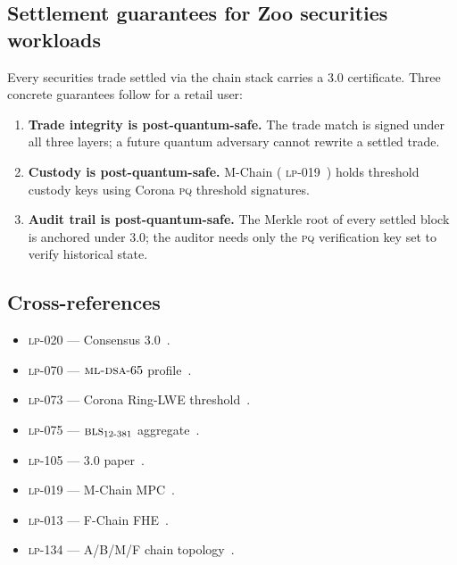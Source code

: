 \subsection{Settlement guarantees for Zoo securities workloads}

Every securities trade settled via the \Lux{} chain stack carries a
\Quasar{} 3.0 certificate. Three concrete guarantees follow for a
retail user:

\begin{enumerate}[nosep,leftmargin=1.4em]
\item \textbf{Trade integrity is post-quantum-safe.} The trade match
  is signed under all three layers; a future quantum adversary cannot
  rewrite a settled trade.
\item \textbf{Custody is post-quantum-safe.} M-Chain (\Lux{}
  \textsc{lp-019}~\cite{lp-019-mchain}) holds threshold custody keys
  using Corona \textsc{pq} threshold signatures.
\item \textbf{Audit trail is post-quantum-safe.} The Merkle root of
  every settled block is anchored under \Quasar{} 3.0; the auditor
  needs only the \textsc{pq} verification key set to verify
  historical state.
\end{enumerate}

\subsection{Cross-references}

\begin{itemize}[nosep,leftmargin=1.2em]
\item \Lux{} \textsc{lp-020} --- \Quasar{} Consensus 3.0~\cite{lp-020-quasar-3}.
\item \Lux{} \textsc{lp-070} --- $\textsc{ml-dsa}{}\text{-}65$ profile~\cite{lp-070-mldsa}.
\item \Lux{} \textsc{lp-073} --- Corona Ring-LWE threshold~\cite{lp-073-corona}.
\item \Lux{} \textsc{lp-075} --- $\textsc{bls}{}_{12\text{-}381}$ aggregate~\cite{lp-075-bls}.
\item \Lux{} \textsc{lp-105} --- \Quasar{} 3.0 paper~\cite{lp-105-quasar}.
\item \Lux{} \textsc{lp-019} --- M-Chain MPC~\cite{lp-019-mchain}.
\item \Lux{} \textsc{lp-013} --- F-Chain FHE~\cite{lp-013-fchain}.
\item \Lux{} \textsc{lp-134} --- A/B/M/F chain topology~\cite{lp-134-topology}.
\end{itemize}
